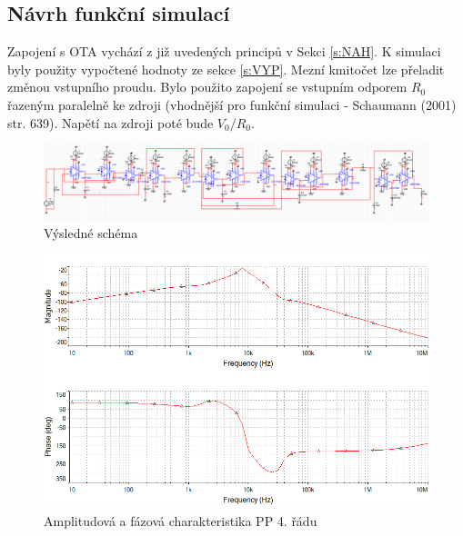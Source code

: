 \subsection{Návrh funkční simulací}
\noindent  Zapojení s OTA vychází z již uvedených principů v Sekci \ref{s:NAH}. K simulaci byly použity vypočtené hodnoty ze sekce \ref{s:VYP}. Mezní kmitočet lze přeladit změnou vstupního proudu.
\noindent Bylo použito zapojení se vstupním odporem $R_0$ řazeným paralelně ke zdroji (vhodnější pro funkční simulaci - Schaumann (2001) str. 639). Napětí na zdroji poté bude $V_0/R_0$.
\begin{figure}[h]
\centering
\includegraphics[scale=0.55]{maple.png}
\caption{Výsledné schéma}
\end{figure}
\begin{figure}[h]
\centering
\includegraphics[scale=0.6]{maple2.png}
\caption{Amplitudová a fázová charakteristika PP 4. řádu}
\end{figure}